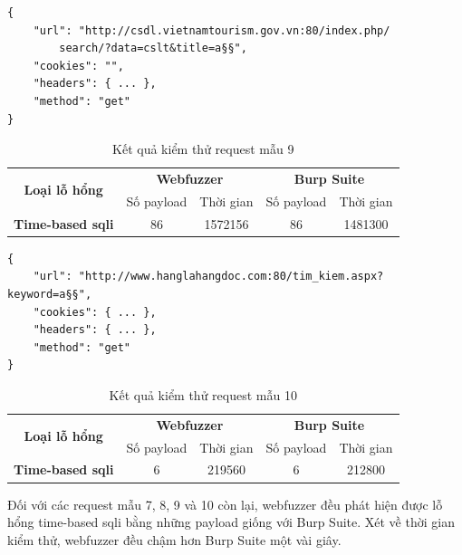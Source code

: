 \FloatBarrier
\begin{lstlisting}[style=ES6, label={lst:base-request-9}, caption={Request mẫu 9 có lỗ hổng time-based \acrshort{sqli}}]
{
    "url": "http://csdl.vietnamtourism.gov.vn:80/index.php/
        search/?data=cslt&title=a§§",
    "cookies": "",
    "headers": { ... },
    "method": "get"
}
\end{lstlisting}
\FloatBarrier
\begin{table}[ht]
    \centering
    \caption{Kết quả kiểm thử request mẫu 9}
    \label{tab:testing-result-9}
    \begin{tabular}[ht]{ccccc}
        \toprule[1pt]\midrule[0.3pt]
            \multirow{2}{*}{\textbf{Loại lỗ hổng}}&\multicolumn{2}{c}{\textbf{Webfuzzer}}&\multicolumn{2}{c}{\textbf{Burp Suite}}\\
            \cmidrule(lr){2-3}\cmidrule(lr){4-5}{}&Số payload&Thời gian&Số payload&Thời gian\\
        \midrule[0.3pt]
            \textbf{Time-based \acrshort{sqli}}&86&1572156&86&1481300\\
        \midrule[0.3pt]\bottomrule[1pt]
    \end{tabular}
\end{table}
\FloatBarrier
\begin{lstlisting}[style=ES6, label={lst:base-request-10}, caption={Request mẫu 10 có lỗ hổng time-based \acrshort{sqli}}]
{
    "url": "http://www.hanglahangdoc.com:80/tim_kiem.aspx?keyword=a§§",
    "cookies": { ... },
    "headers": { ... },
    "method": "get"
}
\end{lstlisting}
\FloatBarrier
\begin{table}[ht]
    \centering
    \caption{Kết quả kiểm thử request mẫu 10}
    \label{tab:testing-result-10}
    \begin{tabular}[ht]{ccccc}
        \toprule[1pt]\midrule[0.3pt]
            \multirow{2}{*}{\textbf{Loại lỗ hổng}}&\multicolumn{2}{c}{\textbf{Webfuzzer}}&\multicolumn{2}{c}{\textbf{Burp Suite}}\\
            \cmidrule(lr){2-3}\cmidrule(lr){4-5}{}&Số payload&Thời gian&Số payload&Thời gian\\
        \midrule[0.3pt]
            \textbf{Time-based \acrshort{sqli}}&6&219560&6&212800\\
        \midrule[0.3pt]\bottomrule[1pt]
    \end{tabular}
\end{table}
\FloatBarrier
Đối với các request mẫu 7, 8, 9 và 10 còn lại, webfuzzer đều phát hiện được lỗ hổng time-based \acrshort{sqli} bằng những payload giống với Burp Suite. Xét về thời gian kiểm thử, webfuzzer đều chậm hơn Burp Suite một vài giây.\par
